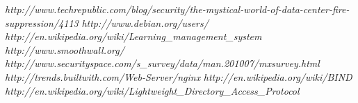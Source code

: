 \documentclass[a4paper, twoside]{article}
\begin{document}
\begin{thebibliography}{1}

 {\em
  http://www.techrepublic.com/blog/security/the-mystical-world-of-data-center-fire-suppression/4113}
 {\em http://www.debian.org/users/}
 {\em http://en.wikipedia.org/wiki/Learning\_management\_system}
 {\em http://www.smoothwall.org/}
 {\em http://www.securityspace.com/s\_survey/data/man.201007/mxsurvey.html}
 {\em http://trends.builtwith.com/Web-Server/nginx}
 {\em http://en.wikipedia.org/wiki/BIND}
 {\em http://en.wikipedia.org/wiki/Lightweight\_Directory\_Access\_Protocol}

\end{thebibliography}
\end{document}
